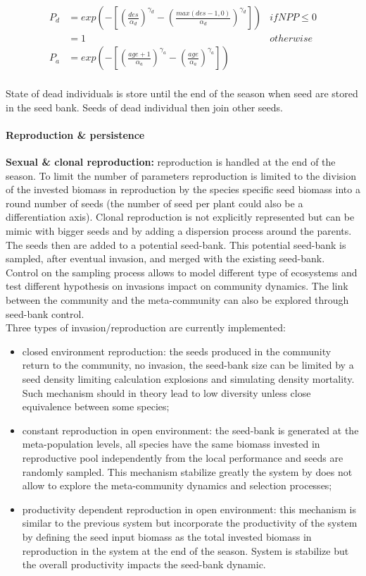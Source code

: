 \documentclass[a4paper,twoside, justified,marginals=raggedright, nobib]{tufte-handout}
\begin{document}
\begin{align}
P_{d} &=  exp \left( - \left[\left(\frac{des}{\alpha_{d}}\right)^{\gamma_{d}} - \left(\frac{max(des - 1, 0)}{\alpha_{d}}\right)^{\gamma_{d}}\right]\right) & if NPP \le 0\\
&= 1 & otherwise\\
P_{a} &= exp \left( - \left[\left(\frac{age + 1}{\alpha_{a}}\right)^{\gamma_{a}} - \left(\frac{age}{\alpha_{a}}\right)^{\gamma_{a}}\right]\right)\\
\end{align}

State of dead individuals is store until the end of the season when seed are stored in the seed bank. Seeds of dead individual then join other seeds.

\paragraph{Reproduction \& persistence}
\textbf{Sexual \& clonal reproduction:} reproduction is handled at the end of the season. To limit the number of parameters reproduction is limited to the division of the invested biomass in reproduction by the species specific seed biomass into a round number of seeds (the number of seed per plant could also be a differentiation axis). Clonal reproduction is not explicitly represented but can be mimic with bigger seeds and by adding a dispersion process around the parents. The seeds then are added to a potential seed-bank. This potential seed-bank is sampled, after eventual invasion, and merged with the existing seed-bank.\\
\indent Control on the sampling process allows to model different type of ecosystems and test different hypothesis on invasions impact on community dynamics. The link between the community and the meta-community can also be explored through seed-bank control.\\
\indent Three types of invasion/reproduction are currently implemented:
\begin{itemize}
\item closed environment reproduction: the seeds produced in the community return to the community, no invasion, the seed-bank size can be limited by a seed density limiting calculation explosions and simulating density mortality. Such mechanism should in theory lead to low diversity unless close equivalence between some species;
\item constant reproduction in open environment: the seed-bank is generated at the meta-population levels, all species have the same biomass invested in reproductive pool independently from the local performance and seeds are randomly sampled. This mechanism stabilize greatly the system by does not allow to explore the meta-community dynamics and selection processes;
\item productivity dependent reproduction in open environment: this mechanism is similar to the previous system but incorporate the productivity of the system by defining the seed input biomass as the total invested biomass in reproduction in the system at the end of the season. System is stabilize but the overall productivity impacts the seed-bank dynamic.
\end{itemize}
\end{document}
